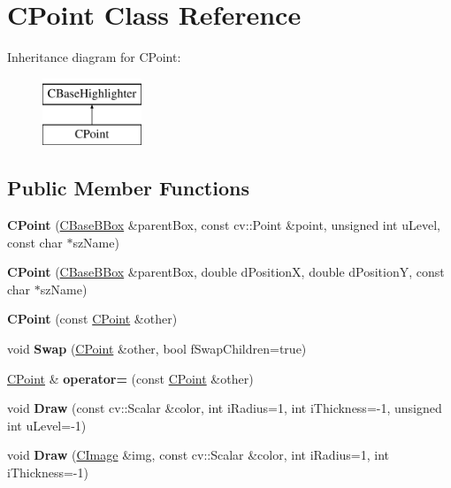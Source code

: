 \hypertarget{class_c_point}{}\section{C\+Point Class Reference}
\label{class_c_point}
Inheritance diagram for C\+Point\+:\begin{figure}[H]
\begin{center}
\leavevmode
\includegraphics[height=2.000000cm]{class_c_point}
\end{center}
\end{figure}
\subsection*{Public Member Functions}
\begin{DoxyCompactItemize}
\item 
\mbox{\label{class_c_point_aef3d46bf07181f0161b630c54263b8d5}} 
{\bfseries C\+Point} (\hyperlink{class_c_base_b_box}{C\+Base\+B\+Box} \&parent\+Box, const cv\+::\+Point \&point, unsigned int u\+Level, const char $\ast$sz\+Name)
\item 
\mbox{\label{class_c_point_a762079d20961a8be6ede2d28018be7a5}} 
{\bfseries C\+Point} (\hyperlink{class_c_base_b_box}{C\+Base\+B\+Box} \&parent\+Box, double d\+PositionX, double d\+PositionY, const char $\ast$sz\+Name)
\item 
\mbox{\label{class_c_point_a12f674d0a9d500b148949a55e9a49581}} 
{\bfseries C\+Point} (const \hyperlink{class_c_point}{C\+Point} \&other)
\item 
\mbox{\label{class_c_point_a3f75d6f3019610e56b5521f19586f63b}} 
void {\bfseries Swap} (\hyperlink{class_c_point}{C\+Point} \&other, bool f\+Swap\+Children=true)
\item 
\mbox{\label{class_c_point_a68f64d65a92847f3cbf949f94a2d3d10}} 
\hyperlink{class_c_point}{C\+Point} \& {\bfseries operator=} (const \hyperlink{class_c_point}{C\+Point} \&other)
\item 
\mbox{\label{class_c_point_a7c2762d29e6f01a75bec57b8c0a400ef}} 
void {\bfseries Draw} (const cv\+::\+Scalar \&color, int i\+Radius=1, int i\+Thickness=-\/1, unsigned int u\+Level=-\/1)
\item 
\mbox{\label{class_c_point_a8a9eab0b48d20229d997c0354f32b21c}} 
void {\bfseries Draw} (\hyperlink{class_c_image}{C\+Image} \&img, const cv\+::\+Scalar \&color, int i\+Radius=1, int i\+Thickness=-\/1)
\end{DoxyCompactItemize}
